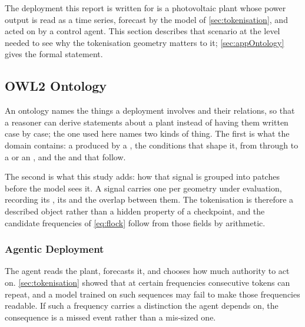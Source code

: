 The deployment this report is written for is a photovoltaic plant whose power output is read as a time series, forecast by the model of \autoref{sec:tokenisation}, and acted on by a control agent. This section describes that scenario at the level needed to see why the tokenisation geometry matters to it; \autoref{sec:appOntology} gives the formal statement.

\subsection{OWL2 Ontology}\label{sec:ontology}
\begingroup
\let\subsection\subsubsection%
An ontology names the things a deployment involves and their relations, so that a reasoner can derive statements about a plant instead of having them written case by case; the one used here names two kinds of thing. The first is what the domain contains: a  produced by a , the conditions that shape it, from  through  to a  or an , and the  and  that follow.

The second is what this study adds: how that signal is grouped into patches before the model sees it. A signal carries one  per geometry under evaluation, recording its , its  and the overlap between them. The tokenisation is therefore a described object rather than a hidden property of a checkpoint, and the candidate frequencies of \autoref{eq:flock} follow from those fields by arithmetic.

\subsection*{Agentic Deployment}
The agent reads the plant, forecasts it, and chooses how much authority to act on\@. \autoref{sec:tokenisation} showed that at certain frequencies consecutive tokens can repeat, and a model trained on such sequences may fail to make those frequencies readable. If such a frequency carries a distinction the agent depends on, the consequence is a missed event rather than a mis-sized one.

